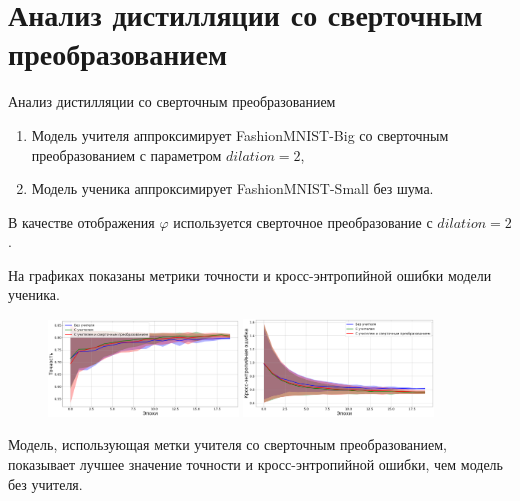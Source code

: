 \documentclass[10pt,pdf,hyperref={unicode}]{beamer}
\begin{document}
\section{Анализ дистилляции со сверточным преобразованием}
\begin{frame}{Анализ дистилляции со сверточным преобразованием}
\begin{enumerate}[1)]
    \item Модель учителя аппроксимирует FashionMNIST-Big со сверточным преобразованием с параметром $dilation=2$,
    \item Модель ученика аппроксимирует FashionMNIST-Small без шума.
\end{enumerate}

\par
В качестве отображения $\varphi$ используется сверточное преобразование с $dilation=2$.

На графиках показаны метрики точности и кросс-энтропийной ошибки модели ученика.

\begin{figure}[h!]
\includegraphics[width=0.45\textwidth]{results/dilation_acc.png}
\includegraphics[width=0.45\textwidth]{results/dilation_loss.png}
\end{figure}

Модель, использующая метки учителя со сверточным преобразованием, показывает лучшее значение точности и кросс-энтропийной ошибки, чем модель без учителя.

\end{frame}

\end{document}
